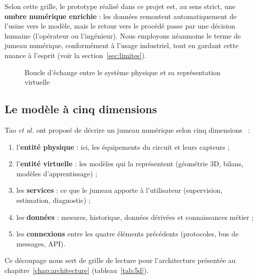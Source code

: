 Selon cette grille, le prototype réalisé dans ce projet est, au sens strict, une \textbf{ombre numérique enrichie} : les données remontent automatiquement de l'usine vers le modèle, mais le retour vers le procédé passe par une décision humaine (l'opérateur ou l'ingénieur). Nous employons néanmoins le terme de jumeau numérique, conformément à l'usage industriel, tout en gardant cette nuance à l'esprit (voir la section~\ref{sec:limites}).

\begin{figure}[H]
\centering
{}
\caption{Boucle d'échange entre le système physique et sa représentation virtuelle}
\label{fig:boucle}
\end{figure}

\subsection{Le modèle à cinq dimensions}
Tao \textit{et al.} ont proposé de décrire un jumeau numérique selon cinq dimensions~\cite{tao2018,tao2019} :
\begin{enumerate}
  \item l'\textbf{entité physique} : ici, les équipements du circuit et leurs capteurs ;
  \item l'\textbf{entité virtuelle} : les modèles qui la représentent (géométrie 3D, bilans, modèles d'apprentissage) ;
  \item les \textbf{services} : ce que le jumeau apporte à l'utilisateur (supervision, estimation, diagnostic) ;
  \item les \textbf{données} : mesures, historique, données dérivées et connaissances métier ;
  \item les \textbf{connexions} entre les quatre éléments précédents (protocoles, bus de messages, API).
\end{enumerate}
Ce découpage nous sert de grille de lecture pour l'architecture présentée au chapitre~\ref{chap:architecture} (tableau~\ref{tab:5d}).

